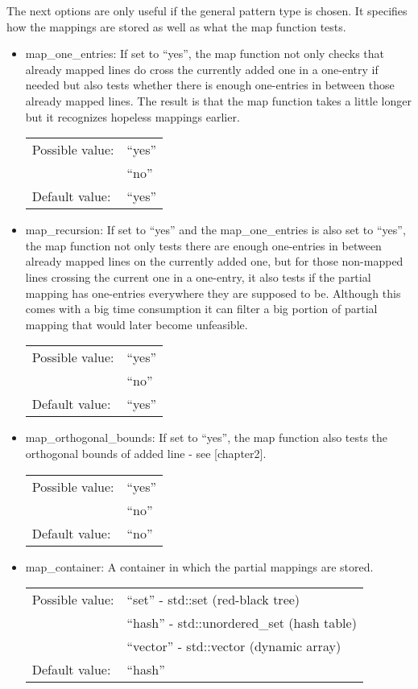 The next options are only useful if the general pattern type is chosen. It specifies how the mappings are stored as well as what the map function tests.
\begin{itemize}
\item map\_one\_entries: If set to ``yes'', the map function not only checks that already mapped lines do cross the currently added one in a one-entry if needed but also tests whether there is enough one-entries in between those already mapped lines. The result is that the map function takes a little longer but it recognizes hopeless mappings earlier.

\begin{tabular}{ll}
Possible value: & ``yes'' \\
& ``no'' \\
Default value: & ``yes''
\end{tabular}

\item map\_recursion: If set to ``yes'' and the map\_one\_entries is also set to ``yes'', the map function not only tests there are enough one-entries in between already mapped lines on the currently added one, but for those non-mapped lines crossing the current one in a one-entry, it also tests if the partial mapping has one-entries everywhere they are supposed to be. Although this comes with a big time consumption it can filter a big portion of partial mapping that would later become unfeasible.

\begin{tabular}{ll}
Possible value: & ``yes'' \\
& ``no'' \\
Default value: & ``yes''
\end{tabular}

\item map\_orthogonal\_bounds: If set to ``yes'', the map function also tests the orthogonal bounds of added line - see [chapter2].

\begin{tabular}{ll}
Possible value: & ``yes'' \\
& ``no'' \\
Default value: & ``no''
\end{tabular}

\item map\_container: A container in which the partial mappings are stored.

\begin{tabular}{ll}
Possible value: & ``set'' - std::set (red-black tree) \\
& ``hash'' - std::unordered\_set (hash table) \\
& ``vector'' - std::vector (dynamic array) \\
Default value: & ``hash''
\end{tabular}


\end{itemize}
